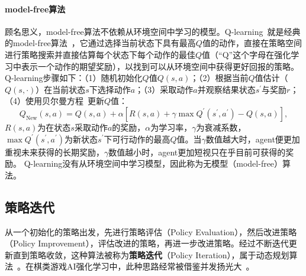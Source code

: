 \paragraph{model-free算法}
顾名思义，model-free算法不依赖从环境空间中学习的模型。Q-learning~\cite{vanHasselt2012}就是经典的model-free算法~\cite{Sutton1998,tdgam,TechnicalNote}，它通过选择当前状态下具有最高$Q$值的动作，直接在策略空间进行策略搜索并直接估算每个状态下每个动作的最佳$Q$值（“Q”这个字母在强化学习中表示一个动作的期望奖励），以找到可以从环境空间中获得更好回报的策略。
Q-learning步骤如下：（1）随机初始化$Q$值$Q(s,a)$；（2）根据当前$Q$值估计（$Q(s,\cdot)$）在当前状态$s$下选择动作$a$；（3）采取动作$a$并观察结果状态$s^{\prime}$与奖励$r$；（4）使用贝尔曼方程~\cite{dixit1990optimization}更新$Q$值：
\begin{equation*}
  Q_{\text{New}}(s,a) = Q(s,a) + \alpha[R(s,a) + \gamma \max Q^{\prime}(s^{\prime},a^{\prime}) - Q(s,a)],
\end{equation*}
$R(s,a)$为在状态$s$采取动作$a$的奖励，$\alpha$为学习率，$\gamma$为衰减系数，$\max Q^{\prime}(s^{\prime},a^{\prime})$为新状态$s^{\prime}$下可行动作的最高$Q$值。当$\gamma$数值越大时，agent便更加重视未来获得的长期奖励，$\gamma$数值越小时，agent更加短视只在乎目前可获得的奖励。
Q-learning没有从环境空间中学习模型，因此称为无模型（model-free）算法。

\subsection{策略迭代}
从一个初始化的策略出发，先进行策略评估（Policy Evaluation），然后改进策略（Policy Improvement），评估改进的策略，再进一步改进策略。经过不断迭代更新直到策略收敛，这种算法被称为\textbf{策略迭代}（Policy Iteration），属于动态规划算法~\cite{Sutton1998}。在棋类游戏AI强化学习中，此种思路经常被借鉴并发扬光大~\cite{Silver1140,Silver2017,Silver2016}。
